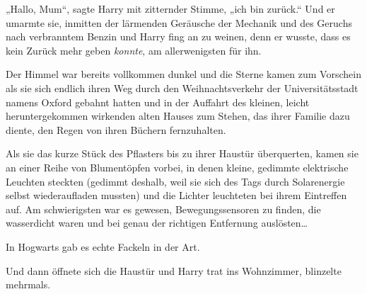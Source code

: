 „Hallo, Mum“, sagte Harry mit zitternder Stimme, „ich bin zurück.“ Und er umarmte sie, inmitten der lärmenden Geräusche der Mechanik und des Geruchs nach verbranntem Benzin und Harry fing an zu weinen, denn er wusste, dass es kein Zurück mehr geben \emph{konnte}, am allerwenigsten für ihn.

\later

Der Himmel war bereits vollkommen dunkel und die Sterne kamen zum Vorschein als sie sich endlich ihren Weg durch den Weihnachtsverkehr der Universitätsstadt namens Oxford gebahnt hatten und in der Auffahrt des kleinen, leicht heruntergekommen wirkenden alten Hauses zum Stehen, das ihrer Familie dazu diente, den Regen von ihren Büchern fernzuhalten.

Als sie das kurze Stück des Pflasters bis zu ihrer Haustür überquerten, kamen sie an einer Reihe von Blumentöpfen vorbei, in denen kleine, gedimmte elektrische Leuchten steckten (gedimmt deshalb, weil sie sich des Tags durch Solarenergie selbst wiederaufladen mussten) und die Lichter leuchteten bei ihrem Eintreffen auf. Am schwierigsten war es gewesen, Bewegungssensoren zu finden, die wasserdicht waren und bei genau der richtigen Entfernung auslösten…

In Hogwarts gab es echte Fackeln in der Art.

Und dann öffnete sich die Haustür und Harry trat ins Wohnzimmer, blinzelte mehrmals.

